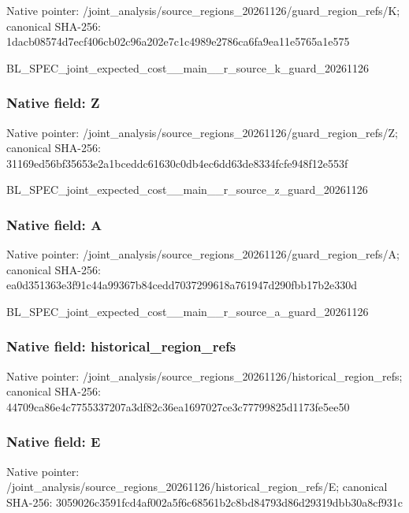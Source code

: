 \documentclass[10pt,a4paper]{article}
\begin{document}
Native pointer: /joint\_analysis/source\_r\allowbreak{}egions\_20261126/guard\_re\allowbreak{}gion\_refs/K; canonical SHA-256: 1dacb08574d7ecf406cb02c9\allowbreak{}6a202e7c1c4989e2786ca6fa\allowbreak{}9ea11e5765a1e575


BL\_SPEC\_joint\_expected\_c\allowbreak{}ost\_\_main\_\_r\_source\_k\_gu\allowbreak{}ard\_20261126


\subsubsection{Native field: Z}


Native pointer: /joint\_analysis/source\_r\allowbreak{}egions\_20261126/guard\_re\allowbreak{}gion\_refs/Z; canonical SHA-256: 31169ed56bf35653e2a1bced\allowbreak{}dc61630c0db4ec6dd63de833\allowbreak{}4fcfe948f12e553f


BL\_SPEC\_joint\_expected\_c\allowbreak{}ost\_\_main\_\_r\_source\_z\_gu\allowbreak{}ard\_20261126


\subsubsection{Native field: A}


Native pointer: /joint\_analysis/source\_r\allowbreak{}egions\_20261126/guard\_re\allowbreak{}gion\_refs/A; canonical SHA-256: ea0d351363e3f91c44a99367\allowbreak{}b84cedd7037299618a761947\allowbreak{}d290fbb17b2e330d


BL\_SPEC\_joint\_expected\_c\allowbreak{}ost\_\_main\_\_r\_source\_a\_gu\allowbreak{}ard\_20261126


\subsubsection{Native field: historical\_region\_refs}


Native pointer: /joint\_analysis/source\_r\allowbreak{}egions\_20261126/historic\allowbreak{}al\_region\_refs; canonical SHA-256: 44709ca86e4c7755337207a3\allowbreak{}df82c36ea1697027ce3c7779\allowbreak{}9825d1173fe5ee50



\subsubsection{Native field: E}


Native pointer: /joint\_analysis/source\_r\allowbreak{}egions\_20261126/historic\allowbreak{}al\_region\_refs/E; canonical SHA-256: 3059026c3591fcd4af002a5f\allowbreak{}6c68561b2c8bd84793d86d29\allowbreak{}319dbb30a8cf931c
\end{document}

